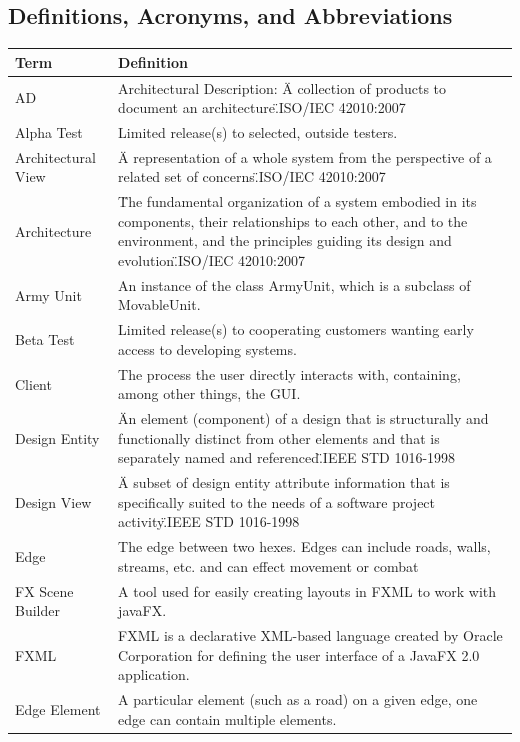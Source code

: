 \documentclass[12pt,a4paper,titlepage]{article}
\begin{document}
\subsection{Definitions, Acronyms, and Abbreviations}
\small{
\begin{center}
\keepXColumns
\noindent\begin{tabularx}{\linewidth}{|p{1.5in}|X|}\hline
\textbf{Term} & \textbf{Definition}\\
\hline
AD & Architectural Description: \"A collection of products to document an architecture.\"\space ISO/IEC 42010:2007\\
\hline
Alpha Test & Limited release(s) to selected, outside testers.\\
\hline
Architectural View & \"A representation of a whole system from the perspective of a related set of concerns.\"\space ISO/IEC 42010:2007\\
\hline
Architecture & \"The fundamental organization of a system embodied in its components, their relationships to each other, and to the environment, and the principles guiding its design and evolution.\"\space ISO/IEC 42010:2007\\
\hline
Army Unit & An instance of the class ArmyUnit, which is a subclass of MovableUnit.\\
\hline
Beta Test & Limited release(s) to cooperating customers wanting early access to developing systems.\\
\hline
Client & The process the user directly interacts with, containing, among other things, the GUI.\\
\hline
Design Entity & \"An element (component) of a design that is structurally and functionally distinct from other elements and that is separately named and referenced.\"\space IEEE STD 1016-1998\\
\hline
Design View & \"A subset of design entity attribute information that is specifically suited to the needs of a software project activity.\"\space IEEE STD 1016-1998\\
\hline
Edge & The edge between two hexes. Edges can include roads, walls, streams, etc. and can effect movement or combat\\
\hline
FX Scene Builder & A tool used for easily creating layouts in FXML to work with javaFX.\\
\hline
FXML & FXML is a declarative XML-based language created by Oracle Corporation for defining the user interface of a JavaFX 2.0 application.\\
Edge Element & A particular element (such as a road) on a given edge, one edge can contain multiple elements.\\

\end{tabularx}
\end{center}}
\end{document}
